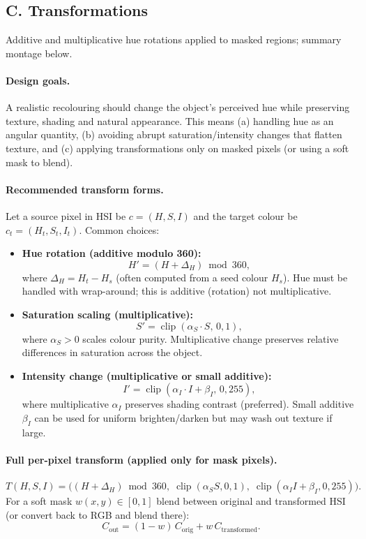 \documentclass[10pt,a4paper]{article}
\begin{document}
\subsection{C. Transformations}
Additive and multiplicative hue rotations applied to masked regions; summary montage below.

\paragraph{Design goals.}
A realistic recolouring should change the object's perceived hue while preserving texture, shading and natural appearance. This means (a) handling hue as an angular quantity, (b) avoiding abrupt saturation/intensity changes that flatten texture, and (c) applying transformations only on masked pixels (or using a soft mask to blend).

\paragraph{Recommended transform forms.}
Let a source pixel in HSI be $c=(H,S,I)$ and the target colour be $c_t=(H_t,S_t,I_t)$. Common choices:

\begin{itemize}
  \item \textbf{Hue rotation (additive modulo 360):} 
    \[
      H' = (H + \Delta_H) \bmod 360,
    \]
    where $\Delta_H = H_t - H_s$ (often computed from a seed colour $H_s$). Hue must be handled with wrap-around; this is additive (rotation) not multiplicative.
  \item \textbf{Saturation scaling (multiplicative):} 
    \[
      S' = \operatorname{clip}(\alpha_S \cdot S,\,0,1),
    \]
    where $\alpha_S>0$ scales colour purity. Multiplicative change preserves relative differences in saturation across the object.
  \item \textbf{Intensity change (multiplicative or small additive):}
    \[
      I' = \operatorname{clip}(\alpha_I \cdot I + \beta_I,\,0,255),
    \]
    where multiplicative $\alpha_I$ preserves shading contrast (preferred). Small additive $\beta_I$ can be used for uniform brighten/darken but may wash out texture if large.
\end{itemize}

\paragraph{Full per-pixel transform (applied only for mask pixels).}
\[
T(H,S,I) = \big( (H+\Delta_H)\bmod 360,\; \operatorname{clip}(\alpha_S S,0,1),\; \operatorname{clip}(\alpha_I I + \beta_I,0,255) \big).
\]
For a soft mask $w(x,y)\in[0,1]$ blend between original and transformed HSI (or convert back to RGB and blend there):
\[
C_{\text{out}} = (1-w)\,C_{\text{orig}} + w\,C_{\text{transformed}}.
\]
\end{document}
